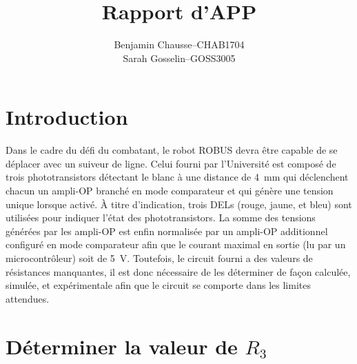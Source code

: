 \documentclass[a11paper, 11pt]{article}
\title{Rapport d'APP}
\author{
  \addtolength{\tabcolsep}{-0.4em}
  \begin{tabular}{rcl} %
      Benjamin Chausse & -- & CHAB1704 \\
      Sarah Gosselin   & -- & GOSS3005 \\
  \end{tabular}
}
\begin{document}
\maketitle
\newpage
\tableofcontents
\newpage

\section{Introduction}

Dans le cadre du défi du combatant, le robot ROBUS devra être capable de se déplacer avec
un suiveur de ligne. Celui fourni par l'Université est composé de trois phototransistors
détectant le blanc à une distance de \SI{4}{\mm} qui déclenchent chacun un ampli-OP branché
en mode comparateur et qui génère une tension unique lorsque activé. À titre d'indication,
trois DELs (rouge, jaune, et bleu) sont utilisées pour indiquer l'état des phototransistors.
La somme des tensions générées par les ampli-OP est enfin normalisée par un ampli-OP additionnel
configuré en mode comparateur afin que le courant maximal en sortie (lu par un microcontrôleur)
soit de \SI{5}{\V}. Toutefois, le circuit fourni a des valeurs de résistances manquantes, il est
donc nécessaire de les déterminer de façon calculée, simulée, et expérimentale afin que le
circuit se comporte dans les limites attendues.


\section{Déterminer la valeur de $R_3$}
\label{sec:first-res}
\end{document}
